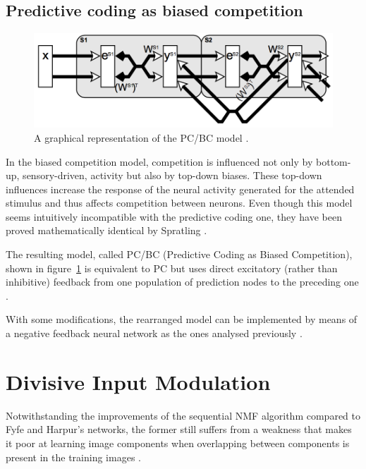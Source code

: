 \documentclass[11pt,a4paper]{report}
\begin{document}
			\subsection{Predictive coding as biased competition}
				\begin{figure}[h]
					\centering
					\includegraphics[width=\textwidth]{pcbc}
					\caption{A graphical representation of the PC/BC model \cite{spratling2008predictive}.}
					\label{fig:pcbc}
				\end{figure}
				
				In the biased competition model, competition is influenced not only by bottom-up, sensory-driven, activity but also by top-down biases. These top-down influences increase the response of the neural activity generated for the attended stimulus and thus affects competition between neurons. Even though this model seems intuitively incompatible with the predictive coding one, they have been proved mathematically identical by Spratling \cite{spratling2008reconciling}.
				
				The resulting model, called PC/BC (Predictive Coding as Biased Competition), shown in figure~\ref{fig:pcbc} is equivalent to PC but uses direct excitatory (rather than inhibitive) feedback from one population of prediction nodes to the preceding one \cite{spratling2008predictive}.
				
				With some modifications, the rearranged model can be implemented by means of a negative feedback neural network as the ones analysed previously \cite{spratling2008reconciling}.
				
		\section{Divisive Input Modulation}
			\label{sec:dim}
			Notwithstanding the improvements of the sequential NMF algorithm compared to Fyfe and Harpur's networks, the former still suffers from a weakness that makes it poor at learning image components when overlapping between components is present in the training images \cite{spratling2009unsupervised}.
			
\end{document}

